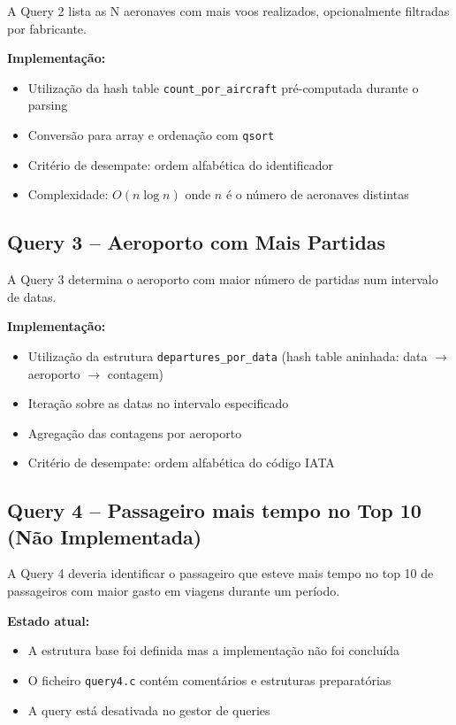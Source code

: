 \documentclass[a4paper,12pt]{scrreprt}
\begin{document}
A Query 2 lista as N aeronaves com mais voos realizados, opcionalmente filtradas por fabricante.

\textbf{Implementação:}
\begin{itemize}
    \item Utilização da hash table \texttt{count\_por\_aircraft} pré-computada durante o parsing
    \item Conversão para array e ordenação com \texttt{qsort}
    \item Critério de desempate: ordem alfabética do identificador
    \item Complexidade: $O(n \log n)$ onde $n$ é o número de aeronaves distintas
\end{itemize}

\subsection{Query 3 -- Aeroporto com Mais Partidas}

A Query 3 determina o aeroporto com maior número de partidas num intervalo de datas.

\textbf{Implementação:}
\begin{itemize}
    \item Utilização da estrutura \texttt{departures\_por\_data} (hash table aninhada: data $\rightarrow$ aeroporto $\rightarrow$ contagem)
    \item Iteração sobre as datas no intervalo especificado
    \item Agregação das contagens por aeroporto
    \item Critério de desempate: ordem alfabética do código IATA
\end{itemize}

\subsection{Query 4 -- Passageiro mais tempo no Top 10 (Não Implementada)}

A Query 4 deveria identificar o passageiro que esteve mais tempo no top 10 de passageiros com maior gasto em viagens durante um período.

\textbf{Estado atual:}
\begin{itemize}
    \item A estrutura base foi definida mas a implementação não foi concluída
    \item O ficheiro \texttt{query4.c} contém comentários e estruturas preparatórias
    \item A query está desativada no gestor de queries
\end{itemize}
\end{document}
